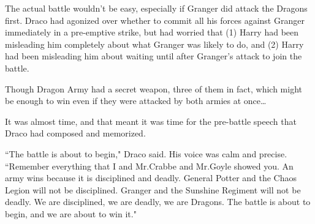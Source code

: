 The actual battle wouldn't be easy, especially if Granger did attack the Dragons first. Draco had agonized over whether to commit all his forces against Granger immediately in a pre-emptive strike, but had worried that (1) Harry had been misleading him completely about what Granger was likely to do, and (2) Harry had been misleading him about waiting until after Granger's attack to join the battle.

Though Dragon Army had a secret weapon, three of them in fact, which might be enough to win even if they were attacked by both armies at once{\ldots}

It was almost time, and that meant it was time for the pre-battle speech that Draco had composed and memorized.

``The battle is about to begin," Draco said. His voice was calm and precise. ``Remember everything that I and Mr.\?Crabbe and Mr.\?Goyle showed you. An army wins because it is disciplined and deadly. General Potter and the Chaos Legion will not be disciplined. Granger and the Sunshine Regiment will not be deadly. We are disciplined, we are deadly, we are Dragons. The battle is about to begin, and we are about to win it."


